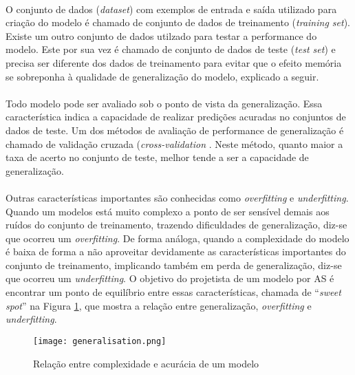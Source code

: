 \paragraph{} O conjunto de dados (\textit{dataset}) com exemplos de entrada e saída utilizado para criação do modelo é chamado de conjunto de dados de treinamento (\textit{training set}). Existe um outro conjunto de dados utilzado para testar a performance do modelo. Este por sua vez é chamado de conjunto de dados de teste (\textit{test set}) e precisa ser diferente dos dados de treinamento para evitar que o efeito memória se sobreponha à qualidade de generalização do modelo, explicado a seguir.

\paragraph{} Todo modelo pode ser avaliado sob o ponto de vista da generalização. Essa característica indica a capacidade de realizar predições acuradas no conjuntos de dados de teste. Um dos métodos de avaliação de performance de generalização é chamado de validação cruzada (\textit{cross-validation} \cite{muller2016introduction}. Neste método, quanto maior a taxa de acerto no conjunto de teste, melhor tende a ser a capacidade de generalização.

\paragraph{} Outras características importantes são conhecidas como \textit{overfitting} e \textit{underfitting}. Quando um modelos está muito complexo a ponto de ser sensível demais aos ruídos do conjunto de treinamento, trazendo dificuldades de generalização, diz-se que ocorreu um \textit{overfitting}. De forma análoga, quando a complexidade do modelo é baixa de forma a não aproveitar devidamente as características importantes do conjunto de treinamento, implicando também em perda de generalização, diz-se que ocorreu um \textit{underfitting}. O objetivo do projetista de um modelo por AS é encontrar um ponto de equilíbrio entre essas características, chamada de ``\textit{sweet spot}'' na Figura \ref{fig:6}, que mostra a relação entre generalização, \textit{overfitting} e \textit{underfitting}.

\begin{figure}[h]
    \texttt{[image: generalisation.png]}
    \centering
    \caption{Relação entre complexidade e acur\'acia de um modelo \cite{muller2016introduction}}
    \label{fig:6}
\end{figure}

